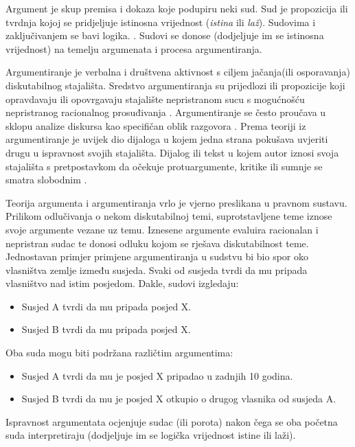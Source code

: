 Argument je skup premisa i dokaza koje podupiru neki sud. Sud je propozicija
ili tvrdnja  kojoj se pridjeljuje istinosna vrijednost
(\emph{istina} ili \emph{laž}). Sudovima i zaključivanjem se bavi logika.
\citep{vukovic2007matematicka}. Sudovi se donose (dodjeljuje im se istinosna
vrijednost) na temelju argumenata i procesa argumentiranja.  

Argumentiranje je verbalna i društvena aktivnost s ciljem jačanja(ili
osporavanja) diskutabilnog stajališta. Sredstvo argumentiranja su prijedlozi
ili propozicije  koji opravdavaju ili opovrgavaju stajalište
nepristranom sucu s mogućnošću nepristranog racionalnog prosuđivanja
\citep{rahwan2006representing}. Argumentiranje se često proučava u sklopu
analize diskursa kao specifičan oblik razgovora \citep{palau2009argumentation}.
Prema teoriji iz \citep{van2003systematic} argumentiranje je uvijek dio
dijaloga u kojem jedna strana pokušava uvjeriti drugu u ispravnost svojih
stajališta. Dijalog ili tekst u kojem autor iznosi svoja stajališta s
pretpostavkom da očekuje protuargumente, kritike ili sumnje se smatra slobodnim
. 

Teorija argumenta i argumentiranja vrlo je vjerno preslikana u pravnom sustavu.
Prilikom odlučivanja o nekom diskutabilnoj temi, suprotstavljene teme iznose
svoje argumente vezane uz temu. Iznesene argumente evaluira racionalan i
nepristran sudac te donosi odluku kojom se rješava diskutabilnost teme.
Jednostavan primjer primjene argumentiranja u sudstvu bi bio spor oko
vlasništva zemlje između susjeda. Svaki od susjeda tvrdi da mu pripada
vlasništvo nad istim posjedom. Dakle, sudovi izgledaju:

\begin{itemize} \item Susjed A tvrdi da mu pripada posjed X.  \item Susjed B
tvrdi da mu pripada posjed X.  \end{itemize}

Oba suda mogu biti podržana različtim argumentima:

\begin{itemize} \item Susjed A tvrdi da mu je posjed X pripadao u zadnjih 10
godina.  \item Susjed B tvrdi da mu je posjed X otkupio o drugog vlasnika od
susjeda A.  \end{itemize}

Ispravnost argumentata ocjenjuje sudac (ili porota) nakon čega se oba početna
suda interpretiraju (dodjeljuje im se logička vrijednost istine ili laži).  

